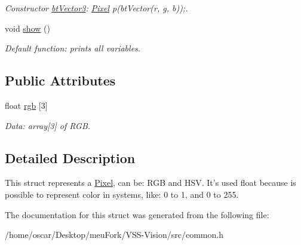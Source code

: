 \begin{DoxyCompactItemize}
\begin{DoxyCompactList}\small\item\em Constructor \hyperlink{structcommon_1_1btVector3}{bt\-Vector3}\-: \hyperlink{structcommon_1_1Pixel}{Pixel} p(bt\-Vector(r, g, b));. \end{DoxyCompactList}\item 
\hypertarget{structcommon_1_1Pixel_a384d642e3fb610b38c813ff6fd8c50e1}{void \hyperlink{structcommon_1_1Pixel_a384d642e3fb610b38c813ff6fd8c50e1}{show} ()}\label{structcommon_1_1Pixel_a384d642e3fb610b38c813ff6fd8c50e1}

\begin{DoxyCompactList}\small\item\em Default function\-: prints all variables. \end{DoxyCompactList}\end{DoxyCompactItemize}
\subsection*{Public Attributes}
\begin{DoxyCompactItemize}
\item 
\hypertarget{structcommon_1_1Pixel_abf3e7070359fa300aeed9af22c74f118}{float \hyperlink{structcommon_1_1Pixel_abf3e7070359fa300aeed9af22c74f118}{rgb} \mbox{[}3\mbox{]}}\label{structcommon_1_1Pixel_abf3e7070359fa300aeed9af22c74f118}

\begin{DoxyCompactList}\small\item\em Data\-: array\mbox{[}3\mbox{]} of R\-G\-B. \end{DoxyCompactList}\end{DoxyCompactItemize}


\subsection{Detailed Description}
This struct represents a \hyperlink{structcommon_1_1Pixel}{Pixel}, can be\-: R\-G\-B and H\-S\-V. It's used float because is possible to represent color in systems, like\-: 0 to 1, and 0 to 255. 

The documentation for this struct was generated from the following file\-:\begin{DoxyCompactItemize}
\item 
/home/oscar/\-Desktop/meu\-Fork/\-V\-S\-S-\/\-Vision/src/common.\-h\end{DoxyCompactItemize}
